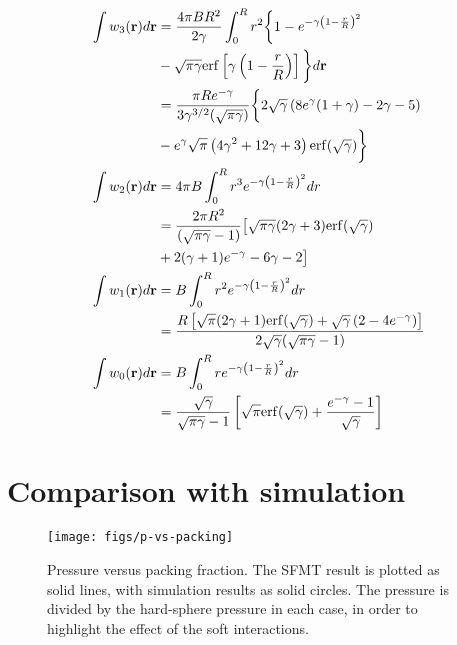 \documentclass[letterpaper,twocolumn,amsmath,amssymb,prb]{revtex4-1}
\newcommand{\rr}{\textbf{r}}
\begin{document}
\begin{align}
  \int w_3(\rr)d\rr &= \frac{4\pi BR^2}{2\gamma}\int_0^R r^2 \bigg\{1-
                     e^{-\gamma \left(1-\frac{r}{R} \right)^2} \notag\\
                    &-\sqrt{\pi \gamma} \mathrm{erf}\left[ \gamma \left(1 - \frac{r}{R}
                      \right) \right] \bigg\} d\rr\\
                     &= \frac{\pi R
                       e^{-\gamma}}{3\gamma^{3/2}(\sqrt{\pi \gamma})}
                     \bigg\{2\sqrt{\gamma}
                     \left(8e^\gamma(1+\gamma)-2\gamma -5 \right) \notag\\
                     &- e^\gamma \sqrt{\pi} \left(4\gamma^2 +12\gamma
                     +3 \right) \mathrm{erf}(\sqrt{\gamma}) \bigg\}\\
  \int w_2(\rr)d\rr &= 4\pi B \int_0^R r^3 e^{-\gamma \left ( 1 - \frac{r}{R}
           \right)^2} dr \\
        &= \frac{2\pi R^2}{(\sqrt{\pi
           \gamma} -1)}\big[ \sqrt{\pi \gamma}(2\gamma
           +3)\mathrm{erf}(\sqrt{\gamma})\notag \\
           & + 2(\gamma + 1)e^{-\gamma} -6\gamma -2 \big] \\
  \int w_1(\rr)d\rr &= B\int_0^R r^2 e^{-\gamma \left ( 1 - \frac{r}{R}
            \right)^2} dr\\
         &= \frac{R\left[ \sqrt{\pi}(2\gamma + 1)\mathrm{erf}(\sqrt{\gamma})
          + \sqrt{\gamma}\left(2-4e^{-\gamma}\right)
          \right]}{2\sqrt{\gamma}( \sqrt{\pi \gamma} -1)} \\
  \int w_0(\rr)d\rr &= B\int_0^R r e^{-\gamma \left ( 1 - \frac{r}{R}
            \right)^2} dr\\
              &= \frac{\sqrt{\gamma}}{\sqrt{\pi \gamma} -1}\left[
              \sqrt{\pi} \mathrm{erf}(\sqrt{\gamma}) +
               \frac{e^{-\gamma}-1}{\sqrt{\gamma}} \right]
\end{align}
 
\section{Comparison with simulation}

\begin{figure}
\begin{center}
\texttt{[image: figs/p-vs-packing]}
\end{center}
\caption{Pressure versus packing fraction.  The SFMT result is plotted
  as solid lines, with simulation results as solid circles.  The
  pressure is divided by the hard-sphere pressure in each case, in
  order to highlight the effect of the soft interactions.}
\label{fig:p-vs-packing}
\end{figure}
\end{document}
